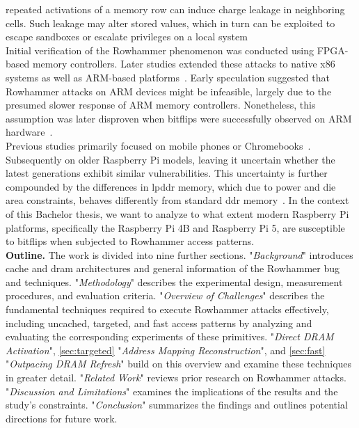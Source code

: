   repeated activations of a memory row can induce charge leakage in neighboring cells. Such leakage 
  may alter stored values, which in turn can be exploited to escape sandboxes or escalate privileges 
  on a local system~\cite{paperRowhammeronaRPi}
  \\
  Initial verification of the Rowhammer phenomenon was conducted using FPGA-based memory controllers. 
  Later studies extended these attacks to native x86 systems as well as ARM-based platforms~\cite{paperRowhammeronaRPi}. 
  Early speculation suggested that Rowhammer attacks on ARM devices might be infeasible, largely due 
  to the presumed slower response of ARM memory controllers. Nonetheless, this assumption was later disproven 
  when bitflips were successfully observed on ARM hardware~\cite{paperDrammer}.
  \\
  Previous studies primarily focused on mobile phones or Chromebooks~\cite{paperHalfDouble, paperDrammer, paperDRAMA, paperBlacksmith}. Subsequently 
  on older Raspberry Pi models, leaving it uncertain whether the latest generations exhibit similar 
  vulnerabilities. This uncertainty is further compounded by the differences in \gls{lpddr} memory, which 
  due to power and die area constraints, behaves differently from standard \gls{ddr} memory~\cite{paperBlacksmith}. In the 
  context of this Bachelor thesis, we want to analyze to what extent modern Raspberry Pi platforms, 
  specifically the Raspberry Pi 4B and Raspberry Pi 5, are susceptible to bitflips when subjected to 
  Rowhammer access patterns.
  \\

    \noindent
    \textbf{Outline.} The work is divided into nine further sections.
     "\textit{Background}" introduces cache and \gls{dram} architectures and general information of the Rowhammer bug and techniques. 
     "\textit{Methodology}" describes the experimental design, measurement procedures, and evaluation criteria. 
     "\textit{Overview of Challenges}" describes the fundamental techniques required to execute Rowhammer attacks effectively, including uncached, targeted, and fast access patterns by analyzing and evaluating the corresponding experiments of these primitives. 
     "\textit{Direct DRAM Activation}", \cref{sec:targeted} "\textit{Address Mapping Reconstruction}", and \cref{sec:fast} "\textit{Outpacing DRAM Refresh}" build on this overview and examine these techniques in greater detail.
     "\textit{Related Work}" reviews prior research on Rowhammer attacks. 
     "\textit{Discussion and Limitations}" examines the implications of the results and the study's constraints. 
     "\textit{Conclusion}" summarizes the findings and outlines potential directions for future work.
